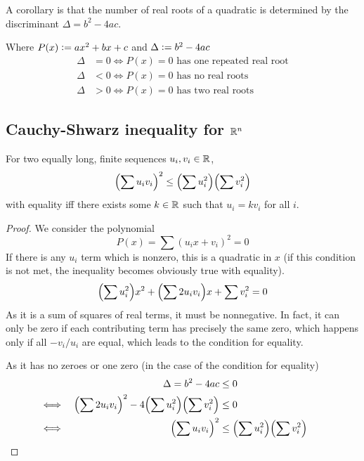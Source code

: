 A corollary is that the number of real roots of a quadratic is determined by the
discriminant \({\Delta = b^2 - 4ac}\).
\begin{corollary}
Where \(P(x) \vcentcolon= ax^2 + bx + c\) and \(\Delta \vcentcolon= b^2 - 4ac\)
\begin{align*}
\Delta &= 0 \iff \text{\(P(x) = 0\) has one repeated real root} \\
\Delta &< 0 \iff \text{\(P(x) = 0\) has no real roots} \\
\Delta &> 0 \iff \text{\(P(x) = 0\) has two real roots}
\end{align*}
\end{corollary}

\subsection[Cauchy-Shwarz inequality for \(\Reals^n\)]
           {Cauchy-Shwarz inequality for \boldmath\(\Reals^n\)}

\begin{theorem}
For two equally long, finite sequences \(u_i, v_i \in \mathbb R\),
\begin{equation*}
\pqty{\sum u_i v_i}^2 \le \pqty{\sum u_i^2} \pqty{\sum v_i^2}
\end{equation*}
with equality iff there exists some \(k \in \mathbb R\) such that
\(u_i = k v_i\) for all \(i\).
\end{theorem}
\begin{proof}
We consider the polynomial
\begin{equation*}
P(x) = \sum (u_i x + v_i)^2 = 0
\end{equation*}
If there is any \(u_i\) term which is nonzero, this is a quadratic in \(x\)
(if this condition is not met, the inequality becomes obviously true with
equality).
\begin{equation*}
\pqty{\sum u_i^2} x^2 + \pqty{\sum 2 u_i v_i} x + \sum v_i^2 = 0
\end{equation*}
As it is a sum of squares of real terms, it must be nonnegative. In fact, it
can only be zero if each contributing term has precisely the same zero,
which happens only if all \(-v_i/u_i\) are equal, which leads to the
condition for equality.

As it has no zeroes or one zero (in the case of the condition for equality)
\begin{alignat*}{2}
&&\Delta = b^2 - 4ac &\le 0 \\
&\iff&
\pqty{\sum 2 u_i v_i}^2 - 4\pqty{\sum u_i^2}\pqty{\sum v_i^2} &\le 0 \\
&\iff& \pqty{\sum u_i v_i}^2 &\le \pqty{\sum u_i^2} \pqty{\sum v_i^2}
    \tag*{\qedhere}
\end{alignat*}
\end{proof}


